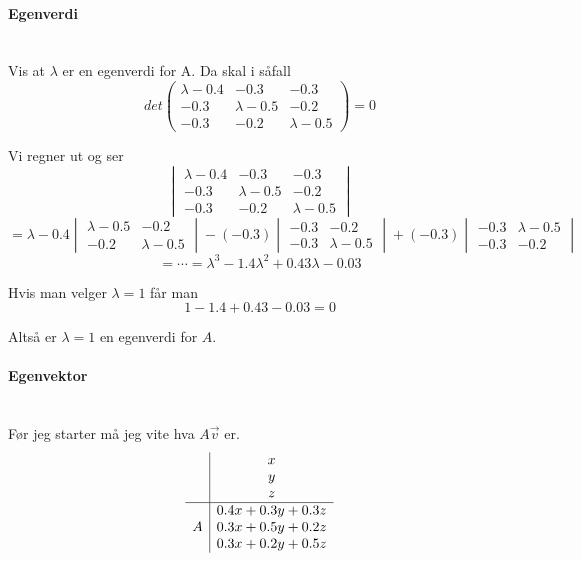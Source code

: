 \paragraph{Egenverdi} \mbox{} \\
Vis at $\lambda$ er en egenverdi for A.
Da skal i såfall
$$det\begin{pmatrix}
     \lambda - 0.4 & -0.3 & -0.3 \\
     -0.3 & \lambda - 0.5 & -0.2 \\
     -0.3 & -0.2 & \lambda - 0.5
     \end{pmatrix} = 0$$

Vi regner ut og ser
$$\begin{vmatrix}
  \lambda - 0.4 & -0.3 & -0.3 \\
  -0.3 & \lambda - 0.5 & -0.2 \\
  -0.3 & -0.2 & \lambda - 0.5
  \end{vmatrix}$$
$$= \lambda - 0.4 \begin{vmatrix}
                  \lambda - 0.5 & -0.2 \\
                  -0.2 & \lambda - 0.5
                  \end{vmatrix}
    -(-0.3)\begin{vmatrix}
           -0.3 & -0.2 \\
           -0.3 & \lambda - 0.5
           \end{vmatrix}
    +(-0.3)\begin{vmatrix}
           -0.3 & \lambda - 0.5 \\
           -0.3 & - 0.2
           \end{vmatrix} $$
$$= \cdots = \lambda^3 - 1.4\lambda^2 + 0.43\lambda - 0.03$$

Hvis man velger $\lambda = 1$ får man
$$1 - 1.4 + 0.43 - 0.03 = 0$$

Altså er $\lambda = 1$ en egenverdi for $A$.



\paragraph{Egenvektor} \mbox{} \\
Før jeg starter må jeg vite hva $A\vec{v}$ er.
$$\begin{array}{c|c}
    & x \\
    & y \\
    & z \\
  \hline
    & 0.4x + 0.3y + 0.3z \\
  A & 0.3x + 0.5y + 0.2z \\
    & 0.3x + 0.2y + 0.5z
  \end{array}$$


